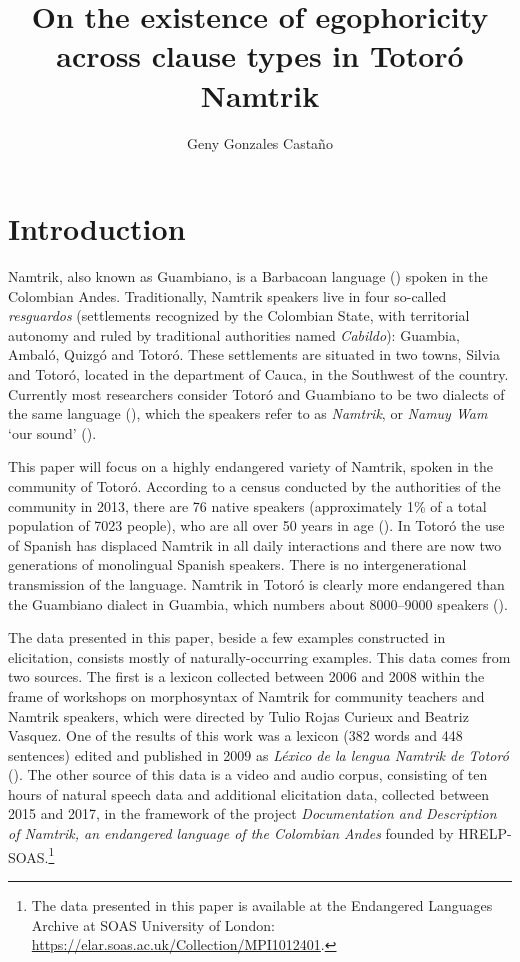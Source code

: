 \documentclass[output=paper]{langsci/langscibook}
\title{On the existence of egophoricity across clause types in Totoró Namtrik}
\author{Geny Gonzales Castaño \affiliation{Laboratoire Dynamique du Langage, Université Lumière Lyon}}
\begin{document}
\maketitle

\section{Introduction} 

Namtrik, also known as Guambiano, is a Barbacoan language (\citealt{CurnowLiddicoat1998}) spoken in the Colombian Andes. Traditionally, Namtrik speakers live in four so-called \emph{resguardos} (settlements recognized by the Colombian State, with territorial autonomy and ruled by traditional authorities named \emph{Cabildo}): Guambia, Ambaló, Quizgó and Totoró. These settlements are situated in two towns, Silvia and Totoró, located in the department of Cauca, in the Southwest of the country. Currently most researchers consider Totoró and Guambiano to be two dialects of the same language (\citealt{CurnowLiddicoat1998}), which the speakers refer to as \textit{Namtrik}, or \textit{Namuy Wam} ‘our sound’ (\citealt{GonzalesCastano2013}).


This paper will focus on a highly endangered variety of Namtrik, spoken in the community of Totoró. According to a census conducted by the authorities of the community in 2013, there are 76 native speakers (approximately 1\% of a total population of 7023 people), who are all over 50 years in age (\citealt[11]{GonzalesCastano2013}). In Totoró the use of Spanish has displaced Namtrik in all daily interactions and there are now two generations of monolingual Spanish speakers. There is no intergenerational transmission of the language. Namtrik in Totoró is clearly more endangered than the Guambiano dialect in Guambia, which numbers about 8000–9000 speakers (\citealt[66]{Adelaar1991}). 

The data presented in this paper, beside a few examples constructed in elicitation, consists mostly of naturally-occurring examples. This data comes from two sources. The first is a lexicon collected between 2006 and 2008 within the frame of workshops on morphosyntax of Namtrik for community teachers and Namtrik speakers, which were directed by Tulio Rojas Curieux and Beatriz Vasquez. One of the results of this work was a lexicon (382 words and 448 sentences) edited and published in 2009 as \emph{Léxico de la lengua Namtrik de Totoró} (\citealt{RojasCurieuxetal2009}). The other source of this data is a video and audio corpus, consisting of ten hours of natural speech data and additional elicitation data, collected between 2015 and 2017, in the framework of the project \emph{Documentation and Description of Namtrik, an endangered language of the Colombian Andes} founded by HRELP-SOAS.\footnote{The data presented in this paper is available at the Endangered Languages Archive at SOAS University of London: \url{https://elar.soas.ac.uk/Collection/MPI1012401}.} 
\end{document}
